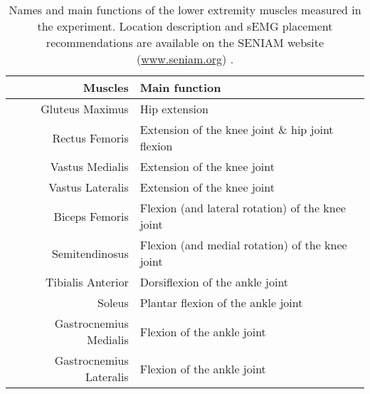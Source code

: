 \begin{table}[ht!]
    \centering
    \caption{Names and main functions of the lower extremity muscles measured in the experiment. Location description and \ac{sEMG} placement recommendations are available on the \ac{SENIAM} website (\href{www.seniam.org}{www.seniam.org}) \cite{Hermens1999}.}
    \label{tab:muscle-names}
    \small
    \begin{tabular}{r | l} %
        Muscles                                 & Main function \\ \hline
        Gluteus Maximus                         & Hip extension \\
        Rectus Femoris                          & Extension of the knee joint \& hip joint flexion\\
        Vastus Medialis                         & Extension of the knee joint\\
        Vastus Lateralis                        & Extension of the knee joint\\
        Biceps Femoris                          & Flexion (and lateral rotation) of the knee joint\\
        Semitendinosus                          & Flexion (and medial rotation) of the knee joint\\
        Tibialis Anterior                       & Dorsiflexion of the ankle joint \\
        Soleus                                  & Plantar flexion of the ankle joint\\
        Gastrocnemius Medialis                  & Flexion of the ankle joint\\
        Gastrocnemius Lateralis                 & Flexion of the ankle joint\\
    \end{tabular}
\end{table}